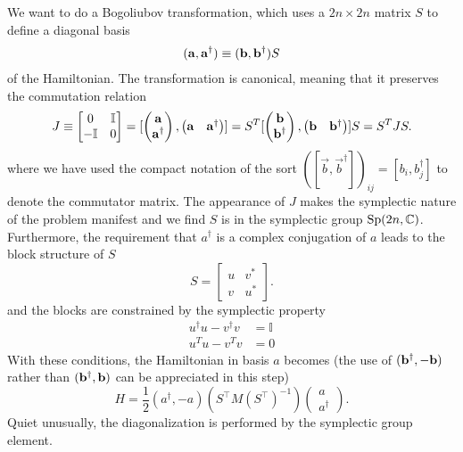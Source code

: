 We want to do a Bogoliubov transformation, which uses a $2n \times 2n$ matrix $S$ to define a diagonal basis 
\begin{equation}\begin{aligned}
\label{eq:def_a}
({\bf a} , {\bf a}^\dagger)\equiv({\bf b} , {\bf b}^\dagger)S
\end{aligned}\end{equation}
of the Hamiltonian. The transformation is canonical, meaning that it preserves the commutation relation 
\begin{equation}
\begin{aligned}
\label{eq:preserve_commutator}
J\equiv\begin{bmatrix}
0 & \mathbb{I}\\
-\mathbb{I} & 0
\end{bmatrix}
=[
\begin{pmatrix}
{\bf a} \\
{\bf a}^\dagger
\end{pmatrix},
\begin{pmatrix}
{\bf a} & {\bf a}^\dagger
\end{pmatrix}]
=S^T[
\begin{pmatrix}
{\bf b} \\
{\bf b}^\dagger
\end{pmatrix},
\begin{pmatrix}
{\bf b} & {\bf b}^\dagger
\end{pmatrix}]S
=S^T JS.
\end{aligned}
\end{equation}
where we have used the compact notation of the sort $([\vec{b}, \vec{b}^{\dagger}])_{ij} =  [b_i, b_j^\dagger]$ to denote the commutator matrix. The appearance of $J$ makes the symplectic nature of the problem manifest and we find $S$ is in the symplectic group ${\rm Sp}( 2n, \mathbb{C} ) $\cite{blaizot_quantum_1986,fulton_representation_2004}. Furthermore, the requirement that $a^\dagger$ is a complex conjugation of $a$ leads to the block structure of $S$
\begin{equation}
\label{eq:block_S}
S=
\begin{bmatrix}
u & v^*\\
v & u^*
\end{bmatrix}.
\end{equation}
and the blocks are constrained by the symplectic property
\begin{eqnarray}
  u^\dagger u-v^\dagger v&=\mathbb{I}\label{eq:constraint_1}\\
  u^T u-v^T v&=0\label{eq:constraint_2}  
\end{eqnarray}
With these conditions, the Hamiltonian in basis $a$ becomes (the use of $({\bf b}^\dagger , -{\bf b})$ rather than $({\bf b}^\dagger , {\bf b})$ can be appreciated in this step)
\begin{equation}
H = \frac{1}{2} ( a^{\dagger}, -a )  (S^{\top} M (S^{\top})^{-1} )
\begin{pmatrix}
a\\
a^{\dagger} 
\end{pmatrix}.
\end{equation}
Quiet unusually, the diagonalization is performed by the symplectic group element.

